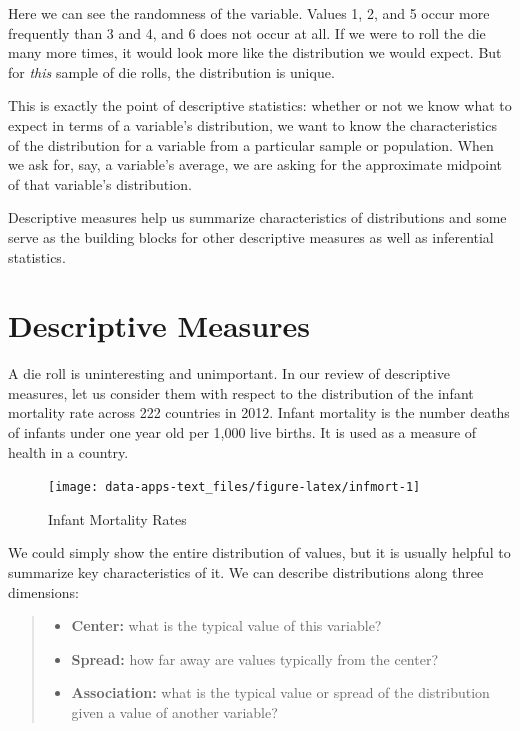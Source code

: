 \documentclass[
]{book}
\providecommand{\tightlist}{%
  \setlength{\itemsep}{0pt}\setlength{\parskip}{0pt}}
\begin{document}
Here we can see the randomness of the variable. Values 1, 2, and 5 occur more frequently than 3 and 4, and 6 does not occur at all. If we were to roll the die many more times, it would look more like the distribution we would expect. But for \emph{this} sample of die rolls, the distribution is unique.

This is exactly the point of descriptive statistics: whether or not we know what to expect in terms of a variable's distribution, we want to know the characteristics of the distribution for a variable from a particular sample or population. When we ask for, say, a variable's average, we are asking for the approximate midpoint of that variable's distribution.

Descriptive measures help us summarize characteristics of distributions and some serve as the building blocks for other descriptive measures as well as inferential statistics.

\hypertarget{descriptive-measures}{%
\section{Descriptive Measures}\label{descriptive-measures}}

A die roll is uninteresting and unimportant. In our review of descriptive measures, let us consider them with respect to the distribution of the infant mortality rate across 222 countries in 2012. Infant mortality is the number deaths of infants under one year old per 1,000 live births. It is used as a measure of health in a country.

\begin{figure}

{\centering \texttt{[image: data-apps-text\_files/figure-latex/infmort-1]} 

}

\caption{Infant Mortality Rates}\label{fig:infmort}
\end{figure}

We could simply show the entire distribution of values, but it is usually helpful to summarize key characteristics of it. We can describe distributions along three dimensions:

\begin{quote}
\begin{itemize}
\tightlist
\item
  \textbf{Center:} what is the typical value of this variable?
\item
  \textbf{Spread:} how far away are values typically from the center?
\item
  \textbf{Association:} what is the typical value or spread of the distribution given a value of another variable?
\end{itemize}
\end{quote}
\end{document}
